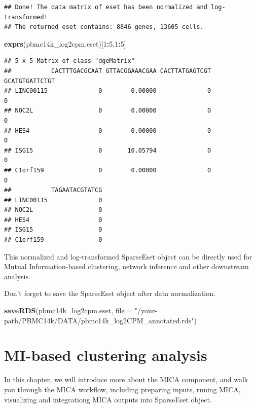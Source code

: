 \documentclass[
  12pt,
]{book}
\newenvironment{Shaded}{\begin{snugshade}}{\end{snugshade}}
\newcommand{\AttributeTok}[1]{\textcolor[rgb]{0.13,0.29,0.53}{#1}}
\newcommand{\DecValTok}[1]{\textcolor[rgb]{0.00,0.00,0.81}{#1}}
\newcommand{\FunctionTok}[1]{\textcolor[rgb]{0.13,0.29,0.53}{\textbf{#1}}}
\newcommand{\NormalTok}[1]{#1}
\newcommand{\SpecialCharTok}[1]{\textcolor[rgb]{0.81,0.36,0.00}{\textbf{#1}}}
\newcommand{\StringTok}[1]{\textcolor[rgb]{0.31,0.60,0.02}{#1}}
\begin{document}
\begin{verbatim}
## Done! The data matrix of eset has been normalized and log-transformed!
## The returned eset contains: 8846 genes, 13605 cells.
\end{verbatim}

\begin{Shaded}
\begin{Highlighting}[]
\FunctionTok{exprs}\NormalTok{(pbmc14k\_log2cpm.eset)[}\DecValTok{1}\SpecialCharTok{:}\DecValTok{5}\NormalTok{,}\DecValTok{1}\SpecialCharTok{:}\DecValTok{5}\NormalTok{]}
\end{Highlighting}
\end{Shaded}

\begin{verbatim}
## 5 x 5 Matrix of class "dgeMatrix"
##           CACTTTGACGCAAT GTTACGGAAACGAA CACTTATGAGTCGT GCATGTGATTCTGT
## LINC00115              0        0.00000              0              0
## NOC2L                  0        0.00000              0              0
## HES4                   0        0.00000              0              0
## ISG15                  0       10.05794              0              0
## C1orf159               0        0.00000              0              0
##           TAGAATACGTATCG
## LINC00115              0
## NOC2L                  0
## HES4                   0
## ISG15                  0
## C1orf159               0
\end{verbatim}

This normalized and log-transformed SparseEset object can be directly used for Mutual Information-based clustering, network inference and other downstream analysis.

Don't forget to save the SparseEset object after data normalization.

\begin{Shaded}
\begin{Highlighting}[]
\FunctionTok{saveRDS}\NormalTok{(pbmc14k\_log2cpm.eset, }\AttributeTok{file =} \StringTok{"/your{-}path/PBMC14k/DATA/pbmc14k\_log2CPM\_annotated.rds"}\NormalTok{)}
\end{Highlighting}
\end{Shaded}

\chapter{MI-based clustering analysis}\label{mi-based-clustering-analysis}

In this chapter, we will introduce more about the MICA component, and walk you through the MICA workflow, including preparing inputs, runing MICA, visualizing and integrationg MICA outputs into SparseEset object.
\end{document}
